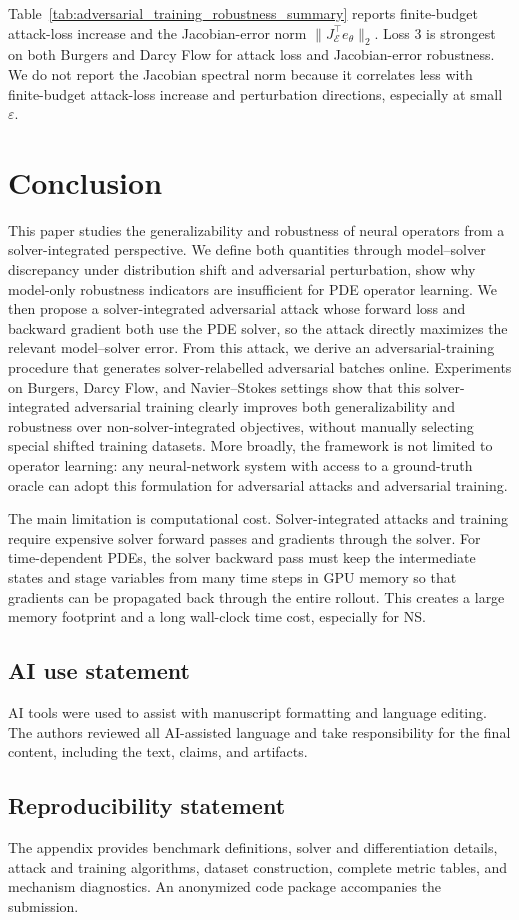 \documentclass{article}
\newcommand{\tabref}[1]{Table~\ref{#1}}
\begin{document}
\tabref{tab:adversarial_training_robustness_summary} reports finite-budget
attack-loss increase and the Jacobian-error norm
\(\|J_{\mathcal E}^{\top}e_\theta\|_2\). Loss 3 is strongest on both Burgers
and Darcy Flow for attack loss and Jacobian-error robustness. We do not report
the Jacobian spectral norm because it correlates less with finite-budget
attack-loss increase and perturbation directions, especially at small
\(\varepsilon\).

\FloatBarrier
\section{Conclusion}

This paper studies the generalizability and robustness of neural operators from
a solver-integrated perspective. We define both quantities through
model--solver discrepancy under distribution shift and adversarial
perturbation, show why model-only robustness indicators are insufficient for PDE
operator learning. We then propose a solver-integrated adversarial attack whose
forward loss and backward gradient both use the PDE solver, so the attack
directly maximizes the relevant model--solver error. From this attack, we derive
an adversarial-training procedure that generates solver-relabelled adversarial
batches online. Experiments on Burgers, Darcy Flow, and Navier--Stokes
settings show that this solver-integrated adversarial training clearly improves
both generalizability and robustness over non-solver-integrated objectives,
without manually selecting special shifted training datasets.
More broadly, the framework is not limited to operator learning: any
neural-network system with access to a ground-truth oracle can adopt this
formulation for adversarial attacks and adversarial training.

The main limitation is computational cost. Solver-integrated attacks and
training require expensive solver forward passes and gradients through the
solver. For time-dependent PDEs, the solver backward pass must keep the
intermediate states and stage variables from many time steps in GPU memory so
that gradients can be propagated back through the entire rollout.
This creates a large memory footprint and a long wall-clock time cost, especially for
NS.
\subsection*{AI use statement}
AI tools were used to assist with manuscript formatting and language editing.
The authors reviewed all AI-assisted language and take responsibility for the
final content, including the text, claims, and artifacts.

\subsection*{Reproducibility statement}
The appendix provides benchmark definitions, solver and differentiation
details, attack and training algorithms, dataset construction, complete metric
tables, and mechanism diagnostics. An anonymized code package accompanies the
submission.




\clearpage

\end{document}
